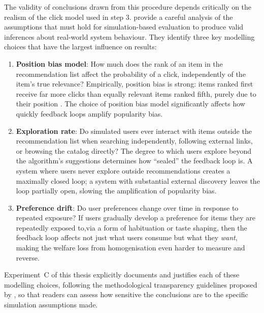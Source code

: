 \documentclass[11pt,a4paper]{report}
\begin{document}
The validity of conclusions drawn from this procedure depends critically on the realism of the click model used in step 3. \citet{yao2021simulatedusers} provide a careful analysis of the assumptions that must hold for simulation-based evaluation to produce valid inferences about real-world system behaviour. They identify three key modelling choices that have the largest influence on results:

\begin{enumerate}
    \item \textbf{Position bias model}: How much does the rank of an item in the recommendation list affect the probability of a click, independently of the item's true relevance? Empirically, position bias is strong: items ranked first receive far more clicks than equally relevant items ranked fifth, purely due to their position \citep{craswell2008position, joachims2005accurately, yao2021simulatedusers}. The choice of position bias model significantly affects how quickly feedback loops amplify popularity bias.

    \item \textbf{Exploration rate}: Do simulated users ever interact with items outside the recommendation list when searching independently, following external links, or browsing the catalog directly? The degree to which users explore beyond the algorithm's suggestions determines how ``sealed'' the feedback loop is. A system where users never explore outside recommendations creates a maximally closed loop; a system with substantial external discovery leaves the loop partially open, slowing the amplification of popularity bias.

    \item \textbf{Preference drift}: Do user preferences change over time in response to repeated exposure? If users gradually develop a preference for items they are repeatedly exposed to,via a form of habituation or taste shaping, then the feedback loop affects not just what users consume but what they \emph{want}, making the welfare loss from homogenisation even harder to measure and reverse.
\end{enumerate}

Experiment~C of this thesis explicitly documents and justifies each of these modelling choices, following the methodological transparency guidelines proposed by \citet{yao2021simulatedusers}, so that readers can assess how sensitive the conclusions are to the specific simulation assumptions made.

\end{document}
